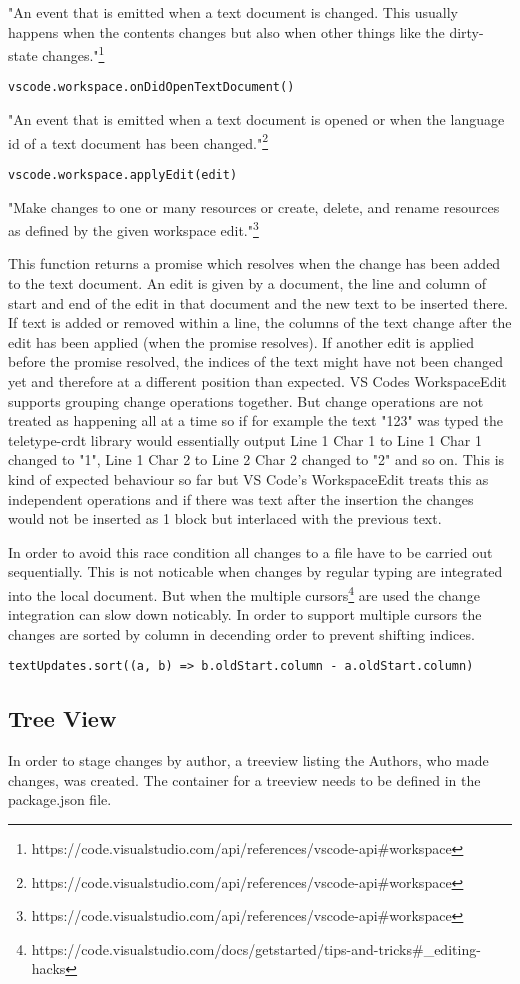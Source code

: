 "An event that is emitted when a text document is changed. This usually happens when the contents changes but also when other things like the dirty-state changes."\footnote{https://code.visualstudio.com/api/references/vscode-api\#workspace}

\begin{lstlisting}
vscode.workspace.onDidOpenTextDocument()
\end{lstlisting}

"An event that is emitted when a text document is opened or when the language id of a text document has been changed."\footnote{https://code.visualstudio.com/api/references/vscode-api\#workspace}

\begin{lstlisting}
vscode.workspace.applyEdit(edit)
\end{lstlisting}
"Make changes to one or many resources or create, delete, and rename resources as defined by the given workspace edit."\footnote{https://code.visualstudio.com/api/references/vscode-api\#workspace}

This function returns a promise which resolves when the change has been added to the text document.
An edit is given by a document, the line and column of start and end of the edit in that document and the new text to be inserted there.
If text is added or removed within a line, the columns of the text change after the edit has been applied (when the promise resolves). If another edit is applied before the promise resolved, the indices of the text might have not been changed yet and therefore at a different position than expected. VS Codes WorkspaceEdit supports grouping change operations together. But change operations are not treated as happening all at a time so if for example the text "123" was typed the teletype-crdt library would essentially output Line 1 Char 1 to Line 1 Char 1 changed to "1", Line 1 Char 2 to Line 2 Char 2 changed to "2" and so on. This is kind of expected behaviour so far but VS Code's WorkspaceEdit treats this as independent operations and if there was text after the insertion the changes would not be inserted as 1 block but interlaced with the previous text. 

In order to avoid this race condition all changes to a file have to be carried out sequentially. This is not noticable when changes by regular typing are integrated into the local document. But when the multiple cursors\footnote{https://code.visualstudio.com/docs/getstarted/tips-and-tricks\#\_editing-hacks} are used the change integration can slow down noticably. In order to support multiple cursors the changes are sorted by column in decending order to prevent shifting indices. 
\begin{lstlisting}
textUpdates.sort((a, b) => b.oldStart.column - a.oldStart.column)
\end{lstlisting}

\subsection{Tree View}

In order to stage changes by author, a treeview listing the Authors, who made changes, was created.
The container for a treeview needs to be defined in the package.json file. 